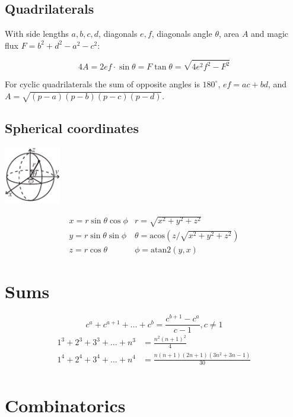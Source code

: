 \subsection{Quadrilaterals}
With side lengths $a,b,c,d$, diagonals $e, f$, diagonals angle $\theta$, area $A$ and
magic flux $F=b^2+d^2-a^2-c^2$:

\[ 4A = 2ef \cdot \sin\theta = F\tan\theta = \sqrt{4e^2f^2-F^2} \]

 For cyclic quadrilaterals the sum of opposite angles is $180^\circ$,
$ef = ac + bd$, and $A = \sqrt{(p-a)(p-b)(p-c)(p-d)}$.

\subsection{Spherical coordinates}
\begin{center}
\includegraphics[width=25mm]{resources/Math/sphericalCoordinates}
\end{center}
\[\begin{array}{cc}
x = r\sin\theta\cos\phi & r = \sqrt{x^2+y^2+z^2}\\
y = r\sin\theta\sin\phi & \theta = \textrm{acos}(z/\sqrt{x^2+y^2+z^2})\\
z = r\cos\theta & \phi = \textrm{atan2}(y,x)
\end{array}\]

\section{Sums}
\[ c^a + c^{a+1} + \dots + c^{b} = \frac{c^{b+1} - c^a}{c-1}, c \neq 1 \]
\begin{align*}
	1^3 + 2^3 + 3^3 + \dots + n^3 &= \frac{n^2(n+1)^2}{4} \\
	1^4 + 2^4 + 3^4 + \dots + n^4 &= \frac{n(n+1)(2n+1)(3n^2 + 3n - 1)}{30} \\
\end{align*}

\section{Combinatorics}

